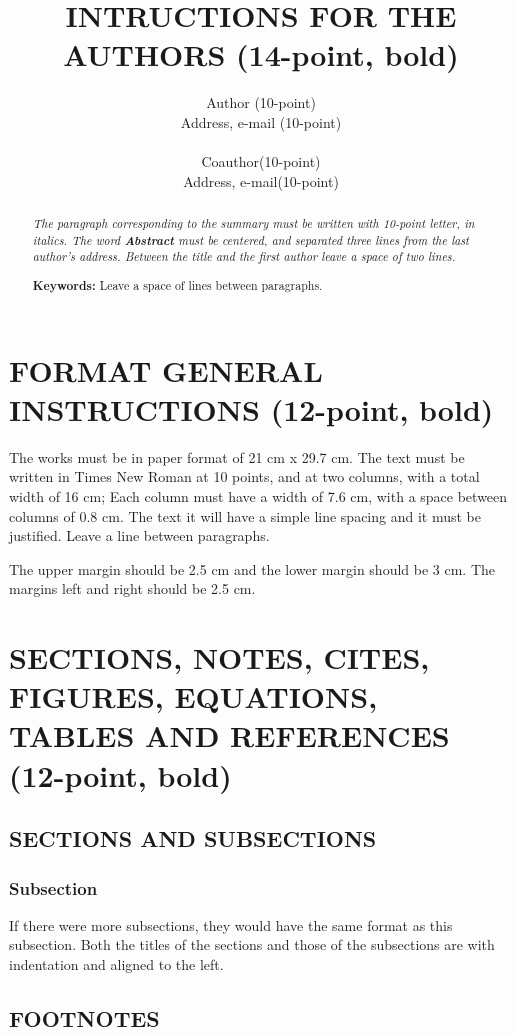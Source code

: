 \documentclass{article}
\title{INTRUCTIONS FOR THE AUTHORS (14-point, bold)}
\author{Author (10-point)\\Address, e-mail (10-point) \\ \\ Coauthor(10-point)\\ Address, e-mail(10-point)}
\begin{document}
\maketitle

\begin{abstract}
{\em The paragraph corresponding to the summary must be written with 10-point letter, in italics. The word {\bf Abstract} must be centered, and separated three lines from the last author's address. Between the title and the first author leave a space of two lines.}

{\bf Keywords:} Leave a space of lines between paragraphs.\\
\end{abstract}

\section{FORMAT GENERAL INSTRUCTIONS (12-point, bold)}

The works must be in paper format of 21 cm x 29.7 cm.
The text must be written in Times New Roman at 10 points, and at two
columns, with a total width of 16 cm; Each column must have
a width of 7.6 cm, with a space between columns of 0.8 cm. The text
it will have a simple line spacing and it must be justified. Leave
a line between paragraphs.

The upper margin should be 2.5 cm and the lower margin should be 3 cm. The margins
left and right should be 2.5 cm.

\section{SECTIONS, NOTES, CITES, FIGURES, EQUATIONS, TABLES AND REFERENCES (12-point, bold)}

\subsection{SECTIONS AND SUBSECTIONS}

\subsubsection{Subsection}

If there were more subsections, they would have the same format as this subsection.
Both the titles of the sections and those of the subsections are with
indentation and aligned to the left.

\subsection{FOOTNOTES}
\end{document}
